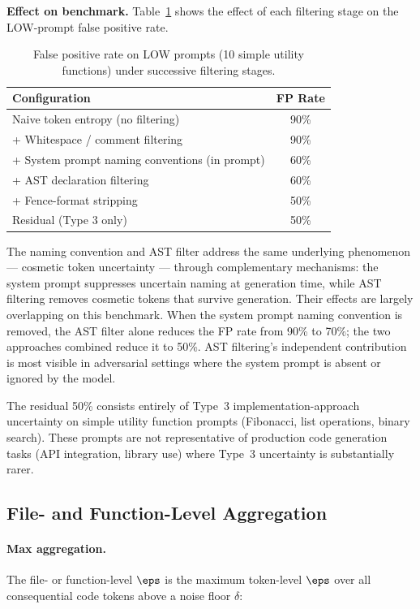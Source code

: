 \textbf{Effect on benchmark.} Table~\ref{tab:filtering} shows the effect of
each filtering stage on the LOW-prompt false positive rate.

\begin{table}[h]
\centering
\caption{False positive rate on LOW prompts (10 simple utility functions)
         under successive filtering stages.}
\label{tab:filtering}
\begin{tabular}{lc}
\toprule
\textbf{Configuration} & \textbf{FP Rate} \\
\midrule
Naive token entropy (no filtering)      & 90\% \\
+ Whitespace / comment filtering        & 90\% \\
+ System prompt naming conventions (in prompt) & 60\% \\
+ AST declaration filtering             & 60\% \\
+ Fence-format stripping                & 50\% \\
\midrule
Residual (Type 3 only)                  & 50\% \\
\bottomrule
\end{tabular}
\end{table}

The naming convention and AST filter address the same underlying phenomenon
--- cosmetic token uncertainty --- through complementary mechanisms: the
system prompt suppresses uncertain naming at generation time, while AST
filtering removes cosmetic tokens that survive generation. Their effects are
largely overlapping on this benchmark. When the system prompt naming
convention is removed, the AST filter alone reduces the FP rate from 90\% to
70\%; the two approaches combined reduce it to 50\%. AST filtering's
independent contribution is most visible in adversarial settings where the
system prompt is absent or ignored by the model.

The residual 50\% consists entirely of Type~3 implementation-approach
uncertainty on simple utility function prompts (Fibonacci, list operations,
binary search). These prompts are not representative of production code
generation tasks (API integration, library use) where Type~3 uncertainty
is substantially rarer.

\subsection{File- and Function-Level Aggregation}
\label{sec:eps-aggregation}

\paragraph{Max aggregation.}
The file- or function-level $\eps$ is the maximum token-level $\eps$ over
all consequential code tokens above a noise floor $\delta$:

